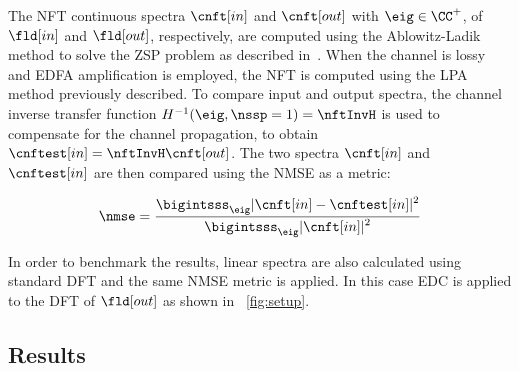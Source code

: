 The \ac{NFT} continuous spectra $\cnft[in]$ and $\cnft[out]$  with $\eig\in
\CC^+$, of $\fld[in]$ and $\fld[out]$, respectively, are computed using the
Ablowitz-Ladik method to solve the \ac{ZSP} problem as described
in~\cite{yousefi2014information}. When the channel is lossy and \ac{EDFA} amplification is
employed, the \ac{NFT} is computed using the \ac{LPA} method
previously described. To compare input and output spectra, the channel inverse
transfer function $H^{-1}(\eig, \nssp=1) = \nftInvH$ is used to compensate for the channel
propagation, to obtain $\cnftest[in] = \nftInvH\cnft[out]$. The two spectra
$\cnft[in]$ and $\cnftest[in]$ are then compared using the \ac{NMSE} as a metric:

\begin{equation}
 \nmse = \dfrac{ \displaystyle \bigintsss_{\eig}
 |\cnft[in] - \cnftest[in]|^2}{\displaystyle \bigintsss_{\eig}|\cnft[in]|^2}
\end{equation}

In order to benchmark the results, linear spectra are also calculated using
standard \ac{DFT} and the same \ac{NMSE} metric is applied. In this case \ac{EDC} is applied to the \ac{DFT} of $\fld[out]$ as shown in
\figurename~\ref{fig:setup}.


\subsection{Results}

